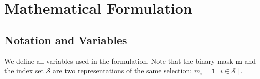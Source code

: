 \documentclass[12pt,a4paper]{article}
\newcommand{\vm}{\mathbf{m}}     %
\begin{document}
\section{Mathematical Formulation}
\label{sec:math}

\subsection{Notation and Variables}

We define all variables used in the formulation. Note that the binary mask $\vm$
and the index set $\mathcal{S}$ are two representations of the same selection:
$m_i = \mathbf{1}[i \in \mathcal{S}]$.
\end{document}
